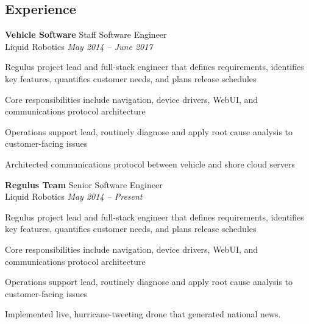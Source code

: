 \documentclass[margin, line]{resume}
\begin{document}
\begin{resume}
    \section{\mysidestyle Experience}


    \textbf{Vehicle Software} \hfill Staff Software Engineer\\  
    Liquid Robotics \hfill \textsl{May 2014 -- June 2017} \\
    \vspace{ -2 mm}
    \begin{list2}
        \item Regulus project lead and full-stack engineer that defines requirements, identifies key features, quantifies customer needs, and plans release schedules
        \item Core responsibilities include navigation, device drivers, WebUI, and communications protocol architecture
        \item Operations support lead, routinely diagnose and apply root cause analysis to customer-facing issues
        \item Architected communications protocol between vehicle and shore cloud servers
    \end{list2}\vspace{-2mm}

    \textbf{Regulus Team} \hfill Senior Software Engineer\\  
    Liquid Robotics \hfill \textsl{May 2014 -- Present} \\
    \vspace{ -2 mm}
    \begin{list2}
        \item Regulus project lead and full-stack engineer that defines requirements, identifies key features, quantifies customer needs, and plans release schedules
        \item Core responsibilities include navigation, device drivers, WebUI, and communications protocol architecture
        \item Operations support lead, routinely diagnose and apply root cause analysis to customer-facing issues
        \item Implemented live, hurricane-tweeting drone that generated national news.
    \end{list2}\vspace{-2mm}


\end{resume}
\end{document}
